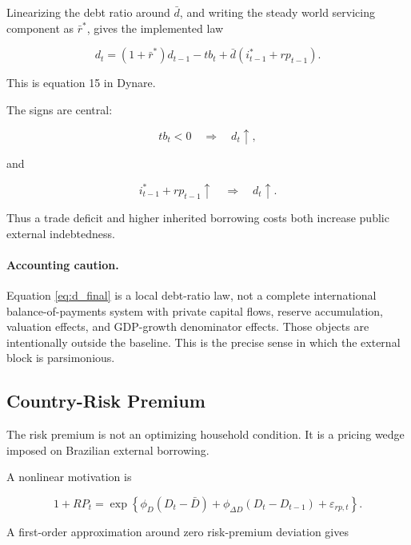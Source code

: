 Linearizing the debt ratio around \(\bar d\), and writing the steady world
servicing component as \(\bar r^{*}\), gives the implemented law

\begin{equation}
\boxed{
d_t
=
(1+\bar r^{*})d_{t-1}
-
tb_t
+
\bar d
\left(
i_{t-1}^{*}+rp_{t-1}
\right).
}
\label{eq:d_final}
\end{equation}

This is equation 15 in Dynare.

The signs are central:

\[
tb_t<0
\quad\Rightarrow\quad
d_t\uparrow,
\]

and

\[
i_{t-1}^{*}+rp_{t-1}\uparrow
\quad\Rightarrow\quad
d_t\uparrow.
\]

Thus a trade deficit and higher inherited borrowing costs both increase public
external indebtedness.

\paragraph{Accounting caution.}

Equation \eqref{eq:d_final} is a local debt-ratio law, not a complete
international balance-of-payments system with private capital flows, reserve
accumulation, valuation effects, and GDP-growth denominator effects. Those
objects are intentionally outside the baseline. This is the precise sense in
which the external block is parsimonious.

\subsection{Country-Risk Premium}
\label{app:riskpremium}

The risk premium is not an optimizing household condition. It is a pricing
wedge imposed on Brazilian external borrowing.

A nonlinear motivation is

\begin{equation}
1+RP_t
=
\exp
\left\{
\phi_D(D_t-\bar D)
+
\phi_{\Delta D}(D_t-D_{t-1})
+
\varepsilon_{rp,t}
\right\}.
\end{equation}

A first-order approximation around zero risk-premium deviation gives

